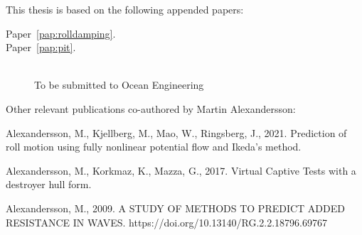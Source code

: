 

This thesis is based on the following appended papers:

\begin{description}
\item[Paper~\ref{pap:rolldamping}.]


\item[Paper~\ref{pap:pit}.] 
\\
To be submitted to Ocean Engineering

\end{description}

\vspace{1cm}

\noindent Other relevant publications co-authored by Martin Alexandersson:
\begin{description}
\normalsize
\newcommand{\ME}{{\bfseries Martin Alexandersson}}

\item
{}

\item
Alexandersson, M., Kjellberg, M., Mao, W., Ringsberg, J., 2021. Prediction of roll motion using fully nonlinear potential flow and Ikeda’s method.

\item
Alexandersson, M., Korkmaz, K., Mazza, G., 2017. Virtual Captive Tests with a destroyer hull form.

\item
Alexandersson, M., 2009. A STUDY OF METHODS TO PREDICT ADDED RESISTANCE IN WAVES. https://doi.org/10.13140/RG.2.2.18796.69767

\end{description}

